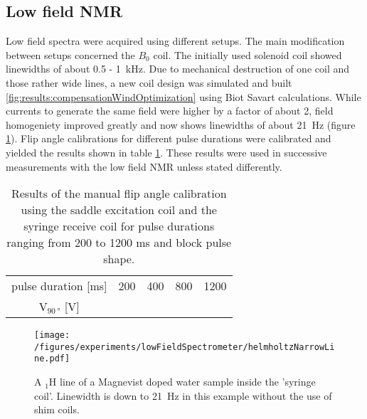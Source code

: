    \subsection{Low field NMR}
    \label{chap:results:lowFieldNMR}
        Low field spectra were acquired using different setups. The main modification between setups concerned the $B_0$ coil. The initially used solenoid coil showed linewidths of about 0.5 - \SI{1}{\kilo\hertz}. Due to mechanical destruction of one coil and those rather wide lines, a new coil design was simulated and built \ref{fig:results:compensationWindOptimization} using Biot Savart calculations. While currents to generate the same field were higher by a factor of about 2, field homogeniety improved greatly and now shows linewidths of about \SI{21}{\hertz} (figure \ref{results:lowFieldSpectrometer:thinLine}). Flip angle calibrations for different pulse durations were calibrated and yielded the results shown in table \ref{table:results:FA}. These results were used in successive measurements with the low field NMR unless stated differently.
        \begin{table}
            \centering
            \begin{tabular}{ccccc}
                pulse duration [ms] & 200 &  400 & 800 & 1200 \\
                $\mathrm{V}_{\SI{90}{\degree}}$ [V] & & & & 
            \end{tabular} 
            \label{table:results:FA}
            \caption{Results of the manual flip angle calibration using the saddle excitation coil and the syringe receive coil for pulse durations ranging from 200 to 1200 ms and block pulse shape.}
        \end{table}
            \begin{figure}
                \centering
                \texttt{[image: /figures/experiments/lowFieldSpectrometer/helmholtzNarrowLine.pdf]}
                \caption{A $_1\mathrm{H}$ line of a Magnevist doped water sample inside the 'syringe coil'. Linewidth is down to \SI{21}{\hertz} in this example without the use of shim coils.}
                \label{results:lowFieldSpectrometer:thinLine}
            \end{figure}

